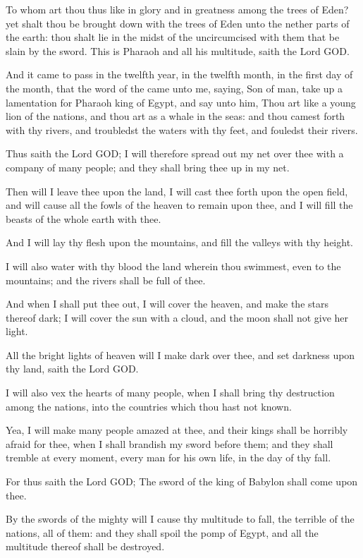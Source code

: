 \Verse To whom art thou thus like in glory and in greatness among the trees of Eden? yet shalt thou be brought down with the trees of Eden unto the nether parts of the earth: thou shalt lie in the midst of the uncircumcised with them that be slain by the sword. This is Pharaoh and all his multitude, saith the Lord GOD.


\Chapter
\Verse And it came to pass in the twelfth year, in the twelfth month, in the first day of the month, that the word of the \LORD came unto me, saying, \Verse Son of man, take up a lamentation for Pharaoh king of Egypt, and say unto him, Thou art like a young lion of the nations, and thou art as a whale in the seas: and thou camest forth with thy rivers, and troubledst the waters with thy feet, and fouledst their rivers.

\Verse Thus saith the Lord GOD; I will therefore spread out my net over thee with a company of many people; and they shall bring thee up in my net.

\Verse Then will I leave thee upon the land, I will cast thee forth upon the open field, and will cause all the fowls of the heaven to remain upon thee, and I will fill the beasts of the whole earth with thee.

\Verse And I will lay thy flesh upon the mountains, and fill the valleys with thy height.

\Verse I will also water with thy blood the land wherein thou swimmest, even to the mountains; and the rivers shall be full of thee.

\Verse And when I shall put thee out, I will cover the heaven, and make the stars thereof dark; I will cover the sun with a cloud, and the moon shall not give her light.

\Verse All the bright lights of heaven will I make dark over thee, and set darkness upon thy land, saith the Lord GOD.

\Verse I will also vex the hearts of many people, when I shall bring thy destruction among the nations, into the countries which thou hast not known.

\Verse Yea, I will make many people amazed at thee, and their kings shall be horribly afraid for thee, when I shall brandish my sword before them; and they shall tremble at every moment, every man for his own life, in the day of thy fall.

\Verse For thus saith the Lord GOD; The sword of the king of Babylon shall come upon thee.

\Verse By the swords of the mighty will I cause thy multitude to fall, the terrible of the nations, all of them: and they shall spoil the pomp of Egypt, and all the multitude thereof shall be destroyed.

